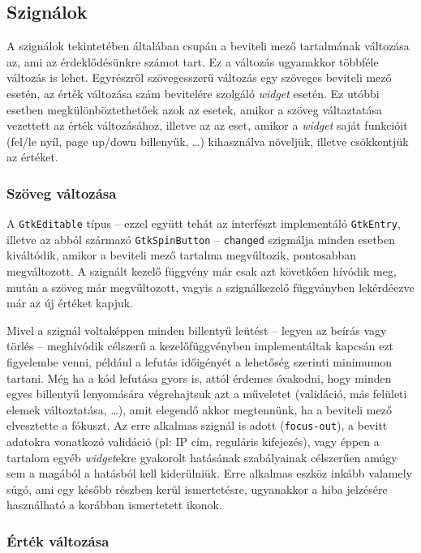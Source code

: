 \subsection{Szignálok}

A szignálok tekintetében általában csupán a beviteli mező tartalmának változása az, ami az érdeklődésünkre számot tart. Ez a változás ugyanakkor többféle változás is lehet. Egyrészről szövegesszerű változás egy szöveges beviteli mező esetén, az érték változása szám bevitelére szolgáló \textit{widget} esetén. Ez utóbbi esetben megkülönböztethetőek azok az esetek, amikor a szöveg váltaztatása vezettett az érték változásához, illetve az az eset, amikor a \textit{widget} saját funkcióit (fel/le nyíl, page up/down billenyűk, \dots) kihasználva növeljük, illetve csökkentjük az értéket.

\subsubsection{Szöveg változása}

A \texttt{GtkEditable} típus -- ezzel együtt tehát az interfészt implementáló \texttt{GtkEntry}, illetve az abból származó \texttt{GtkSpinButton} -- \texttt{changed} szigmálja minden esetben kiváltódik, amikor a beviteli mező tartalma megvűltozik, pontosabban megváltozott. A szignált kezelő függvény már csak azt követkően hívódik meg, mután a szöveg már megvűltozott, vagyis a szignálkezelő függványben lekérdéezve már az új értéket kapjuk.

Mivel a szignál voltaképpen minden billentyű leütést -- legyen az beírás vagy törlés -- meghívódik célszerű a kezelőfüggvényben implementáltak kapcsán ezt figyelembe venni, például a lefutás időigényét a lehetőség szerinti minimumon tartani. Még ha a kód lefutása gyors is, attól érdemes óvakodni, hogy minden egyes billentyű lenyomására végrehajtsuk azt a műveletet (validáció, más felületi elemek változtatása, \dots), amit elegendő akkor megtennünk, ha a beviteli mező elvesztette a fókuszt. Az erre alkalmas szignál is adott (\texttt{focus-out}), a bevitt adatokra vonatkozó validáció (pl: IP cím, reguláris kifejezés), vagy éppen a tartalom egyéb \textit{widget}ekre gyakorolt hatásának szabályainak célszerűen amúgy sem a magából a hatásból kell kiderülniük. Erre alkalmas eszköz inkább valamely súgó, ami egy később részben kerül ismertetésre, ugyanakkor a hiba jelzésére használható a korábban ismertetett ikonok.

\subsubsection{Érték változása}

